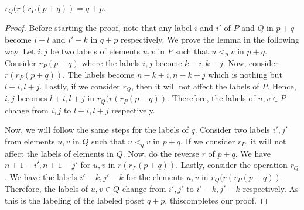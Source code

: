 \documentclass[10pt,a4paper]{amsart}
\begin{document}
\begin{lemma}\label{p+q to q+p}
      $r_Q(r(r_P(p+q))=q+p$.
\end{lemma}

\begin{proof}
    Before starting the proof, note that any label $i$ and $i'$ of $P$ and $Q$ in $p+q$ become 
    $i+l$ and $i'-k$ in $q+p$ respectively. We prove the lemma in the following way. Let $i, j$ 
be two labels of elements $u,v$ in $P$ such that $u<_p v$ in $p+q$. Consider $r_P(p+q)$ where 
the labels $i,j$ become $k-i,k-j$. Now, consider $r(r_P(p+q))$. The labels become $n-k+i,n-k+j$ 
which is nothing but $l+i,l+j$. Lastly, if we consider $r_Q$, then it will not affect the labels 
of $P$. Hence, $i,j$ becomes $l+i,l+j$ in $r_Q(r(r_P(p+q))$. Therefore, the labels of 
$u,v \in P$ change from $i,j$ to $l+i,l+j$ %
respectively.  

 Now, we will follow the same steps for the labels of $q$. Consider two labels $i',j'$ from
 elements $u,v$ in $Q$ such that $u<_q v$ in $p+q$. If we consider $r_P$, it will not affect the 
 labels of elements in $Q$. Now, do the reverse $r$ of $p+q$. We have $n+1-i', n+1-j'$ for $u,v$ 
 in $r(r_P(p+q))$. Lastly, consider the operation $r_Q$. We have the labels $i'-k, j'-k$ for the 
 elements $u,v$ in $r_Q(r(r_P(p+q))$. Therefore, the labels of $u,v \in Q$ change 
 from $i',j'$ to $i'-k,j'-k$ respectively.  As this is the labeling of the labeled poset $q+p$, thiscompletes our proof.
\end{proof}
\end{document}
